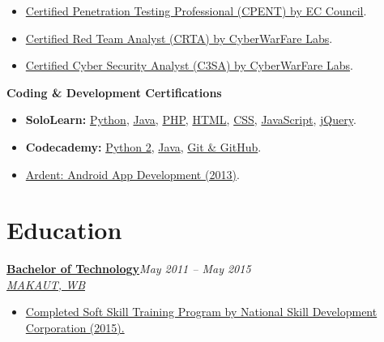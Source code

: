 \documentclass[10pt,a4paper]{article}
\newcommand{\resumeEntry}[4]{
    \textbf{#1}\hfill \textit{#2}\\
    \textit{#3}\hfill #4
    \vspace{1pt}
}
\begin{document}
\begin{itemize}
    \item \href{https://zishanhack.com/about/img/certificate/cpent.jpg}{Certified Penetration Testing Professional (CPENT) by EC Council}.
    \item \href{https://zishanhack.com/about/img/certificate/crta.jpg}{Certified Red Team Analyst (CRTA) by CyberWarFare Labs}.
    \item \href{https://app.kajabi.com/certificates/5481eb7c}{Certified Cyber Security Analyst (C3SA) by CyberWarFare Labs}.
\end{itemize}

\textbf{Coding \& Development Certifications}
\begin{itemize}
    \item \textbf{SoloLearn:} \href{https://web.archive.org/web/20230826182653/https://www.sololearn.com/certificates/CT-ESUIEOIL}{Python}, \href{https://web.archive.org/web/20230827045336/https://www.sololearn.com/certificates/CT-6MPPT9PS}{Java}, \href{https://web.archive.org/web/20230827044856/https://www.sololearn.com/certificates/CT-URP0SEVV}{PHP}, \href{https://web.archive.org/web/20230827045028/https://www.sololearn.com/certificates/CT-O8CPNDPQ}{HTML}, \href{https://web.archive.org/web/20230827044259/https://www.sololearn.com/certificates/CT-6XXLMJLU}{CSS}, \href{https://web.archive.org/web/20230827044658/https://www.sololearn.com/certificates/CT-V5B4OHBJ}{JavaScript}, \href{https://web.archive.org/web/20230827045224/https://www.sololearn.com/certificates/CT-8D99WRRR}{jQuery}.
    \item \textbf{Codecademy:} \href{https://www.codecademy.com/profiles/ZishanAdThandar/certificates/b97fd4d87a816c761a674af1b5391ef1}{Python 2}, \href{https://www.codecademy.com/profiles/ZishanAdThandar/certificates/d3f89367b558583e361640f778191345}{Java}, \href{https://www.codecademy.com/profiles/ZishanAdThandar/certificates/a8ab218d5950c29861635cc0bf12fd13}{Git \& GitHub}.
    \item \href{https://zishanhack.com/about/img/certificate/ardent.jpg}{Ardent: Android App Development (2013)}.
\end{itemize}

\section{Education}

\resumeEntry{\href{https://zishanhack.com/about/img/certificate/makaut.jpg}{Bachelor of Technology}}{May 2011 -- May 2015}{\href{https://zishanhack.com/about/img/certificate/makaut.jpg}{MAKAUT, WB}}{}
\begin{itemize}
    \item \href{https://zishanhack.com/about/img/certificate/nsdc.jpg}{Completed Soft Skill Training Program by National Skill Development Corporation (2015).}
\end{itemize}
\end{document}
